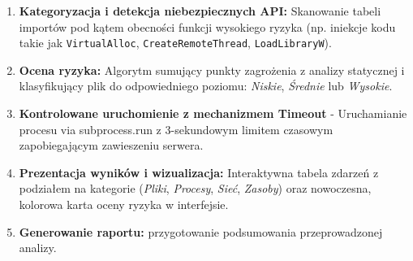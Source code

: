 \documentclass{article}
\begin{document}
\begin{enumerate}
\item \textbf{Kategoryzacja i detekcja niebezpiecznych API:} Skanowanie tabeli importów pod kątem obecności funkcji wysokiego ryzyka (np. iniekcje kodu takie jak \texttt{VirtualAlloc}, \texttt{CreateRemoteThread}, \texttt{LoadLibraryW}).
\item \textbf{Ocena ryzyka:} Algorytm sumujący punkty zagrożenia z analizy statycznej i klasyfikujący plik do odpowiedniego poziomu: \textit{Niskie}, \textit{Średnie} lub \textit{Wysokie}. 
\item \textbf{Kontrolowane uruchomienie z mechanizmem Timeout} - Uruchamianie procesu via subprocess.run z 3-sekundowym limitem czasowym zapobiegającym zawieszeniu serwera. 
\item \textbf{Prezentacja wyników i wizualizacja:} Interaktywna tabela zdarzeń z podziałem na kategorie (\textit{Pliki}, \textit{Procesy}, \textit{Sieć}, \textit{Zasoby}) oraz nowoczesna, kolorowa karta oceny ryzyka w interfejsie.
\item \textbf{Generowanie raportu:} przygotowanie podsumowania przeprowadzonej analizy.      
\end{enumerate}
\end{document}

